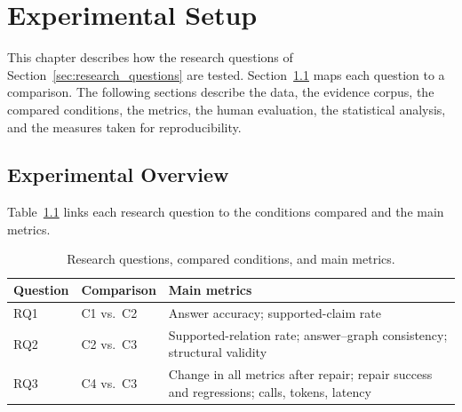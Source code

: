 \chapter{Experimental Setup}
\label{chap:setup}



This chapter describes how the research questions of Section~\ref{sec:research_questions} are tested. Section~\ref{sec:exp_overview} maps each question to a comparison. The following sections describe the data, the evidence corpus, the compared conditions, the metrics, the human evaluation, the statistical analysis, and the measures taken for reproducibility.

\section{Experimental Overview}
\label{sec:exp_overview}

Table~\ref{tab:rq_map} links each research question to the conditions compared and the main metrics.

\begin{table}[H]
\centering
\caption{Research questions, compared conditions, and main metrics.}
\label{tab:rq_map}
\small
\begin{tabularx}{\linewidth}{l l >{\raggedright\arraybackslash}X}
\toprule
Question & Comparison & Main metrics \\
\midrule
RQ1 & C1 vs.\ C2 & Answer accuracy; supported-claim rate \\
RQ2 & C2 vs.\ C3 & Supported-relation rate; answer--graph consistency; structural validity \\
RQ3 & C4 vs.\ C3 & Change in all metrics after repair; repair success and regressions; calls, tokens, latency \\
\bottomrule
\end{tabularx}
\end{table}

